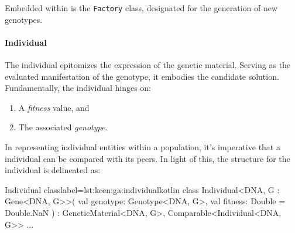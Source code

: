     Embedded within is the \texttt{Factory} class, designated for the 
    generation of new genotypes.

  \paragraph{Individual}
    The individual epitomizes the expression of the genetic material.
    Serving as the evaluated manifestation of the genotype, it embodies the 
    candidate solution.
    Fundamentally, the individual hinges on:
    \begin{enumerate}
        \item A \textit{fitness} value, and
        \item The associated \textit{genotype}.
    \end{enumerate}
    
    In representing individual entities within a population, it's imperative 
    that a individual can be compared with its peers. 
    In light of this, the structure for the individual is delineated as:
    
    \begin{code}{Individual class}{label={lst:keen:ga:individual}}{kotlin}
      class Individual<DNA, G : Gene<DNA, G>>(
          val genotype: Genotype<DNA, G>,
          val fitness: Double = Double.NaN
      ) : GeneticMaterial<DNA, G>, Comparable<Individual<DNA, G>> { ... }
    \end{code}